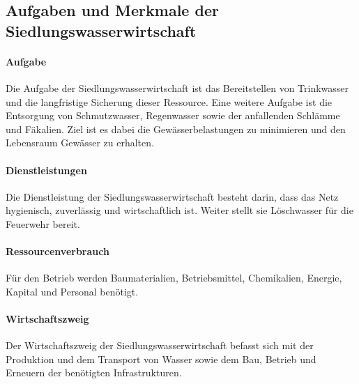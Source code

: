 \documentclass[9pt, openright=false]{scrartcl}
\begin{document}
\subsection{Aufgaben und Merkmale der Siedlungswasserwirtschaft}
\paragraph{Aufgabe} Die Aufgabe der Siedlungswasserwirtschaft ist das Bereitstellen von Trinkwasser und die langfristige Sicherung dieser Ressource. Eine weitere Aufgabe ist die Entsorgung von Schmutzwasser, Regenwasser sowie der anfallenden Schlämme und Fäkalien. Ziel ist es dabei die Gewässerbelastungen zu minimieren und den Lebensraum Gewässer zu erhalten.
\paragraph{Dienstleistungen} Die Dienstleistung der Siedlungswasserwirtschaft besteht darin, dass das Netz hygienisch, zuverlässig und wirtschaftlich ist. Weiter stellt sie Löschwasser für die Feuerwehr bereit.
\paragraph{Ressourcenverbrauch} Für den Betrieb werden Baumaterialien, Betriebsmittel, Chemikalien, Energie, Kapital und Personal benötigt.
\paragraph{Wirtschaftszweig} Der Wirtschaftszweig der Siedlungswasserwirtschaft befasst sich mit der Produktion und dem Transport von Wasser sowie dem Bau, Betrieb und Erneuern der benötigten Infrastrukturen.\clearpage
\end{document}
